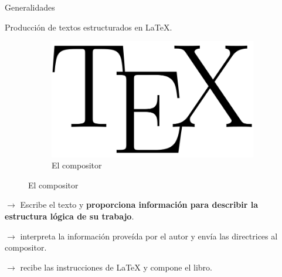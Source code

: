 \begin{frame}{Generalidades}
\begin{block}{Producci\'on de textos estructurados en \LaTeX{}.}
\begin{multicols}{2}
\begin{figure}
                \vspace*{.25cm}				

                \begin{subfigure}[b]{0.5\textwidth} 
                    \centering
                    \includegraphics[scale=.06]{images/compositor_LaTeX}
                    \caption{El compositor}
                \end{subfigure}
            \end{figure}	
            \newpage

            \vspace*{.05cm}
            $\rightarrow$ Escribe el texto y \textbf{proporciona informaci\'on para describir la estructura l\'ogica de su trabajo}.


            \vspace*{.70cm}
            $\rightarrow$ interpreta la informaci\'on proveída por el autor y env\'ia las directrices al compositor.

            \vspace*{.90cm}
            $\rightarrow$ recibe las instrucciones de \LaTeX{} y compone el libro.
        \end{multicols}
    \end{block}
\end{frame}



